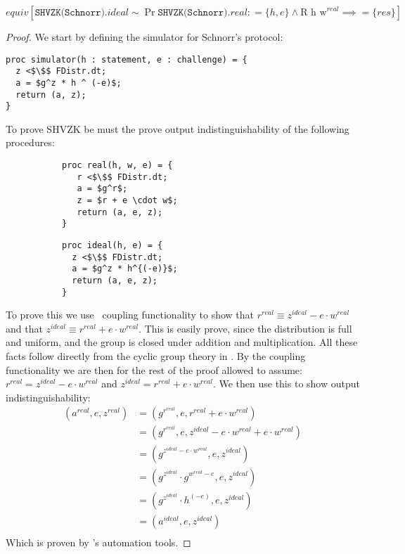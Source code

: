 \begin{lemma}
  \[
    equiv[\texttt{SHVZK(Schnorr)}.ideal \sim \Pr{\texttt{SHVZK(Schnorr)}.real} : =\{h, e\} \land \text{R h w}^{real} \implies =\{res\}]
  \]
\end{lemma}
\begin{proof}
  We start by defining the simulator for Schnorr's protocol:
\begin{lstlisting}[mathescape]
proc simulator(h : statement, e : challenge) = {
  z <$\$$ FDistr.dt;
  a = $g^z * h ^ (-e)$;
  return (a, z);
}
\end{lstlisting}
  To prove SHVZK be must the prove output indistinguishability of the following procedures:
  \begin{figure}[ht]
    \centering
    \begin{subfigure}{0.48\textwidth }
\begin{lstlisting}[mathescape]
proc real(h, w, e) = {
   r <$\$$ FDistr.dt;
   a = $g^r$;
   z = $r + e \cdot w$;
   return (a, e, z);
}
\end{lstlisting}
    \end{subfigure}
    \hfill
    \begin{subfigure}{0.48\textwidth }
\begin{lstlisting}[mathescape]
proc ideal(h, e) = {
  z <$\$$ FDistr.dt;
  a = $g^z * h^{(-e)}$;
  return (a, e, z);
}
\end{lstlisting}
    \end{subfigure}
  \end{figure}
  To prove this we use \easycrypt\ coupling functionality to show that $r^{real} \equiv z^{ideal} - e \cdot w^{real}$ and that $z^{ideal} \equiv r^{real} + e \cdot w^{real}$.
  This is easily prove, since the distribution is full and uniform, and the group is closed under addition and multiplication. All these facts follow directly from the cyclic group theory in \easycrypt.
  By the coupling functionality we are then for the rest of the proof allowed to assume:
  $r^{real} = z^{ideal} - e \cdot w^{real}$ and $z^{ideal} = r^{real} + e \cdot
  w^{real}$. We then use this to show output indistinguishability:
  \begin{align*}
    (a^{real}, e, z^{real}) &= (g^{r^{real}}, e, r^{real} + e \cdot w^{real}) \\
                          &= (g^{r^{real}}, e, z^{ideal} - e \cdot w^{real} + e \cdot w^{real}) \\
                          &= (g^{z^{ideal} - e \cdot w^{real}}, e, z^{ideal}) \\
                          &= (g^{z^{ideal}} \cdot g^{w^{real} - e}, e, z^{ideal}) \\
                          &= (g^{z^{ideal}} \cdot h^{(-e)}, e, z^{ideal}) \\
                          &= (a^{ideal}, e, z^{ideal}) \\
  \end{align*}
  Which is proven by \easycrypt's automation tools.
\end{proof}


